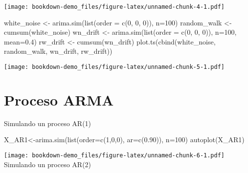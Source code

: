 \documentclass[
]{book}
\newenvironment{Shaded}{\begin{snugshade}}{\end{snugshade}}
\newcommand{\AttributeTok}[1]{\textcolor[rgb]{0.77,0.63,0.00}{#1}}
\newcommand{\DecValTok}[1]{\textcolor[rgb]{0.00,0.00,0.81}{#1}}
\newcommand{\FloatTok}[1]{\textcolor[rgb]{0.00,0.00,0.81}{#1}}
\newcommand{\FunctionTok}[1]{\textcolor[rgb]{0.00,0.00,0.00}{#1}}
\newcommand{\NormalTok}[1]{#1}
\newcommand{\OtherTok}[1]{\textcolor[rgb]{0.56,0.35,0.01}{#1}}
\begin{document}
\texttt{[image: bookdown-demo\_files/figure-latex/unnamed-chunk-4-1.pdf]}

\begin{Shaded}
\begin{Highlighting}[]
\NormalTok{white\_noise }\OtherTok{\textless{}{-}} \FunctionTok{arima.sim}\NormalTok{(}\FunctionTok{list}\NormalTok{(}\AttributeTok{order =} \FunctionTok{c}\NormalTok{(}\DecValTok{0}\NormalTok{, }\DecValTok{0}\NormalTok{, }\DecValTok{0}\NormalTok{)), }\AttributeTok{n=}\DecValTok{100}\NormalTok{)}
\NormalTok{random\_walk }\OtherTok{\textless{}{-}} \FunctionTok{cumsum}\NormalTok{(white\_noise)}
\NormalTok{wn\_drift }\OtherTok{\textless{}{-}} \FunctionTok{arima.sim}\NormalTok{(}\FunctionTok{list}\NormalTok{(}\AttributeTok{order =} \FunctionTok{c}\NormalTok{(}\DecValTok{0}\NormalTok{, }\DecValTok{0}\NormalTok{, }\DecValTok{0}\NormalTok{)), }\AttributeTok{n=}\DecValTok{100}\NormalTok{, }\AttributeTok{mean=}\FloatTok{0.4}\NormalTok{)}
\NormalTok{rw\_drift }\OtherTok{\textless{}{-}} \FunctionTok{cumsum}\NormalTok{(wn\_drift)}
\FunctionTok{plot.ts}\NormalTok{(}\FunctionTok{cbind}\NormalTok{(white\_noise, random\_walk, wn\_drift, rw\_drift))}
\end{Highlighting}
\end{Shaded}

\texttt{[image: bookdown-demo\_files/figure-latex/unnamed-chunk-5-1.pdf]}

\hypertarget{proceso-arma}{%
\section{Proceso ARMA}\label{proceso-arma}}

Simulando un proceso AR(1)

\begin{Shaded}
\begin{Highlighting}[]
\NormalTok{X\_AR1}\OtherTok{\textless{}{-}}\FunctionTok{arima.sim}\NormalTok{(}\FunctionTok{list}\NormalTok{(}\AttributeTok{order=}\FunctionTok{c}\NormalTok{(}\DecValTok{1}\NormalTok{,}\DecValTok{0}\NormalTok{,}\DecValTok{0}\NormalTok{), }\AttributeTok{ar=}\FunctionTok{c}\NormalTok{(}\FloatTok{0.90}\NormalTok{)), }\AttributeTok{n=}\DecValTok{100}\NormalTok{)}
\FunctionTok{autoplot}\NormalTok{(X\_AR1)}
\end{Highlighting}
\end{Shaded}

\texttt{[image: bookdown-demo\_files/figure-latex/unnamed-chunk-6-1.pdf]}
Simulando un proceso AR(2)
\end{document}
